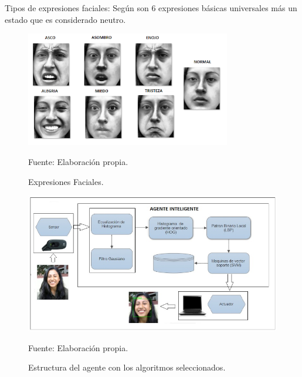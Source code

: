 \begin{itemize}
Tipos de expresiones faciales: \vskip 0.1cm
Según \cite{Ekman} son 6 expresiones básicas universales más un estado que es considerado neutro.

\begin{figure}[ht]
\begin{center}
\includegraphics[width=0.8\textwidth]{Imagen30}
\end{center}
\begin{center}
\vskip -0.5cm
\caption{\small{Expresiones Faciales.}}
{\small{Fuente: Elaboración propia.}}
\end{center}
\end{figure}

\begin{figure}[ht]
\begin{center}
\includegraphics[width=1\textwidth]{Imagen31}
\end{center}
\begin{center}
\vskip -0.5cm
\caption{\small{Estructura del agente con los algoritmos seleccionados.}}
{\small{Fuente: Elaboración propia.}}
\end{center}
\end{figure}

\end{itemize}


